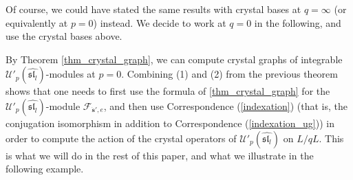 \documentclass[twoside,12pt]{amsart}
\theoremstyle{plain}
\newcommand{\cF}{\mathcal{F}}
\newcommand{\bs}{\mathbf{s}}
\newcommand{\dbs}{\dot{\bs}}
\newcommand{\Ul}{\mathcal{U}'_p (\widehat{\mathfrak{sl}_l})}
\theoremstyle{remark}
\begin{document}
Of course, we could have stated the same results with crystal bases at $q=\infty$ (or equivalently at $p=0$) instead.
We decide to work at $q=0$ in the following, and use the crystal bases above.


\medskip

By Theorem \ref{thm_crystal_graph}, we can compute crystal graphs of integrable $\Ul$-modules at $p=0$.
Combining (1) and (2) from the previous theorem
shows that one needs to first
use the formula of \ref{thm_crystal_graph} for the $\Ul$-module $\cF_{\dbs',e}$, and then
use Correspondence (\ref{indexation}) (that is, the conjugation isomorphism in addition to Correspondence (\ref{indexation_ug}))
in order to compute the action of the crystal operators of $\Ul$ on $L/qL$.
This is what we will do in the rest of this paper, and what we illustrate in the following example.
\end{document}
